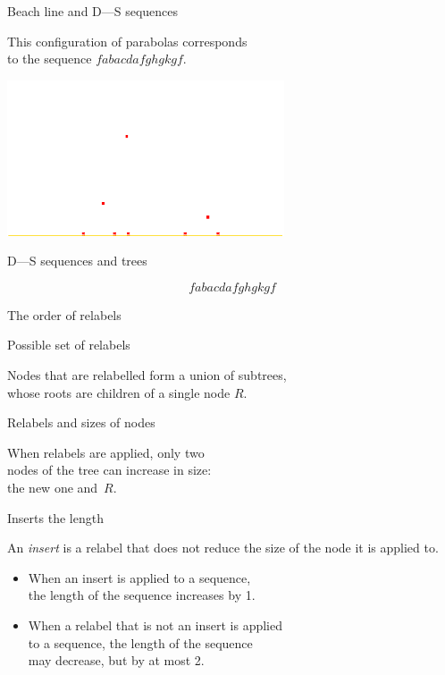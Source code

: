 \documentclass[17pt]{extarticle}
\newcommand{\newslide}[1]{\newpage \begin{center} \large #1 \end{center}}
\begin{document}
\newslide{Beach line and D—S sequences} \vspace{-7mm}

This configuration of parabolas corresponds \\
to the sequence \( fabacdafghgkgf \).

\begin{center}
	\includegraphics[height=4.6cm]{figs/parab-config-dark}
\end{center}

\newslide{D—S sequences and trees} \vspace{-7mm}
\[ fabacdafghgkgf \] \vspace{-16mm}



\newslide{The order of relabels}



\newslide{Possible set of relabels} \vspace{-15mm}

 \vspace{-2mm}

Nodes that are relabelled form a union of subtrees, \\
whose roots are children of a single node \(R\).

\newslide{Relabels and sizes of nodes}

When relabels are applied, only two \\
nodes of the tree can increase in size:\\
the new one and~\( R \).

\newslide{Inserts the length} \vspace{-6mm}

	An {\it insert} is a relabel that does not reduce the size of the node it is applied to. \vspace{-3mm}

\begin{itemize}
	\item When an insert is applied to a sequence, \\
	   the length of the sequence increases by 1.
	\item When a relabel that is not an insert is applied \\
	   to a sequence, the length of the sequence \\
	   may decrease, but by at most 2.
\end{itemize}
\end{document}
